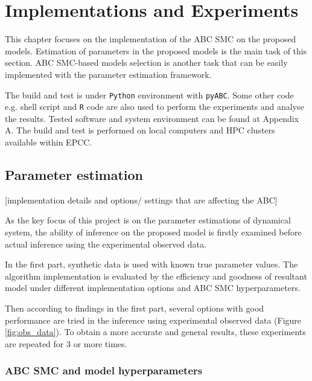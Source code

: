 \documentclass[12pt,a4paper]{report}
\begin{document}

\chapter{Implementations and Experiments}

This chapter focuses on the implementation of the ABC SMC on the proposed models. Estimation of  parameters in the proposed models is the main task of this section. ABC SMC-based models selection is another task that can be easily implemented with the parameter estimation framework.

The build and test is under \verb|Python| environment with \verb|pyABC|\cite{ref:pyabc}. Some other code e.g. shell script and \verb|R| code are also used to perform the experiments and analyse the results. Tested software and system environment can be found at Appendix A. The build and test is performed on local computers and HPC clusters available within EPCC.

\section{Parameter estimation}

[implementation details and options/ settings that are affecting the ABC]

As the key focus of this project is on the parameter estimations of dynamical system, the ability of inference on the proposed model is firstly examined before actual inference using the experimental observed data.

In the first part, synthetic data is used with known true parameter values. The algorithm implementation is evaluated by the efficiency and goodness of resultant model under different implementation options and ABC SMC hyperparameters.

Then according to findings in the first part, several options with good performance are tried in the inference using experimental observed data (Figure \ref{fig:obs_data}). To obtain a more accurate and general results, these experiments are repeated for 3 or more times.

\subsection{ABC SMC and model hyperparameters}
\end{document}
